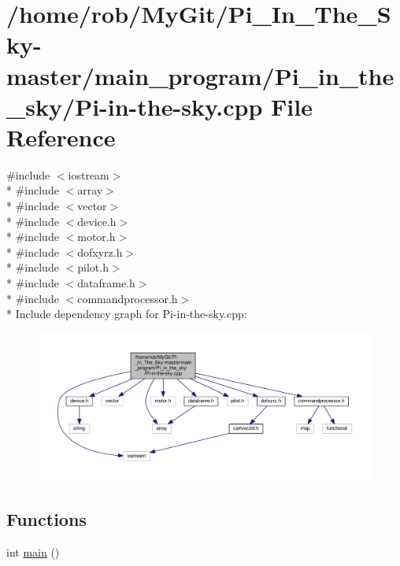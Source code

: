 \hypertarget{_pi__in__the__sky_2_pi-in-the-sky_8cpp}{}\section{/home/rob/\+My\+Git/\+Pi\+\_\+\+In\+\_\+\+The\+\_\+\+Sky-\/master/main\+\_\+program/\+Pi\+\_\+in\+\_\+the\+\_\+sky/\+Pi-\/in-\/the-\/sky.cpp File Reference}
\label{_pi__in__the__sky_2_pi-in-the-sky_8cpp}
{\ttfamily \#include $<$iostream$>$}\\*
{\ttfamily \#include $<$array$>$}\\*
{\ttfamily \#include $<$vector$>$}\\*
{\ttfamily \#include $<$device.\+h$>$}\\*
{\ttfamily \#include $<$motor.\+h$>$}\\*
{\ttfamily \#include $<$dofxyrz.\+h$>$}\\*
{\ttfamily \#include $<$pilot.\+h$>$}\\*
{\ttfamily \#include $<$dataframe.\+h$>$}\\*
{\ttfamily \#include $<$commandprocessor.\+h$>$}\\*
Include dependency graph for Pi-\/in-\/the-\/sky.cpp\+:\nopagebreak
\begin{figure}[H]
\begin{center}
\leavevmode
\includegraphics[width=350pt]{_pi__in__the__sky_2_pi-in-the-sky_8cpp__incl}
\end{center}
\end{figure}
\subsection*{Functions}
\begin{DoxyCompactItemize}
\item 
int \hyperlink{_pi__in__the__sky_2_pi-in-the-sky_8cpp_ae66f6b31b5ad750f1fe042a706a4e3d4}{main} ()
\end{DoxyCompactItemize}
